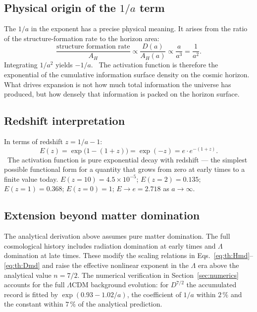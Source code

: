 \subsection{Physical origin of the $1/a$ term}
The $1/a$ in the exponent has a precise physical meaning. It arises from the ratio of the structure-formation rate to the horizon area:
\begin{equation}\frac{\text{structure formation rate}}{A_H}\propto\frac{D(a)}{A_H(a)}\propto\frac{a}{a^3}=\frac{1}{a^2}.\label{eq:th:surfdens}\end{equation}
Integrating $1/a^2$ yields $-1/a$. \derived\ The activation function is therefore the exponential of the cumulative information surface density on the cosmic
horizon. What drives expansion is not how much total information the universe has produced, but how densely that information is packed on the
horizon surface. \interp

\subsection{Redshift interpretation}
In terms of redshift $z=1/a-1$:
\begin{equation}E(z)=\exp\big(1-(1+z)\big)=\exp(-z)=e\cdot e^{-(1+z)}.\label{eq:th:Ez}\end{equation}
\derived\ The activation function is pure exponential decay with redshift --- the simplest possible functional form for a quantity that grows from zero
at early times to a finite value today. $E(z{=}10)=4.5\times10^{-5}$; $E(z{=}2)=0.135$; $E(z{=}1)=0.368$; $E(z{=}0)=1$; $E\to e=2.718$ as $a\to\infty$. \calc

\subsection{Extension beyond matter domination}
The analytical derivation above assumes pure matter domination. The full cosmological history includes radiation domination at early times and
$\Lambda$ domination at late times. These modify the scaling relations in Eqs.~\eqref{eq:th:Hmd}--\eqref{eq:th:Dmd} and raise the effective nonlinear exponent
in the $\Lambda$ era above the analytical value $n=7/2$. The numerical verification in Section~\ref{sec:numerics} accounts for the full $\Lambda$CDM background
evolution: for $D^{7/2}$ the accumulated record is fitted by $\exp(0.93-1.02/a)$, the coefficient of $1/a$ within $2\,\%$ and the constant within
$7\,\%$ of the analytical prediction. \calc

